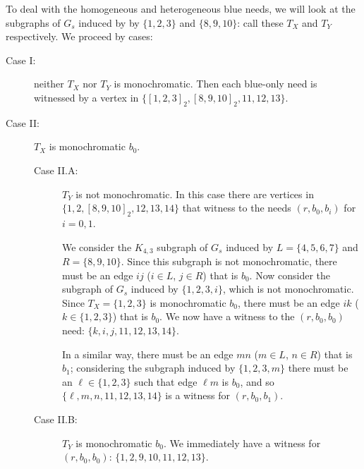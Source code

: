 \documentclass{article}
\theoremstyle{definition}
\begin{document}
To deal with the homogeneous and heterogeneous blue needs, we will look at the
subgraphs of $G_{s}$ induced by by $\{1,2,3\}$ and $\{8,9,10\}$: call these
$T_{X}$ and $T_{Y}$ respectively.  We proceed by cases:
\begin{description}
\item[Case I:] neither $T_{X}$ nor $T_{Y}$ is monochromatic. Then each blue-only
  need is witnessed by a vertex in $\{[1,2,3]_{2},[8,9,10]_{2},11,12,13\}$.
\item[Case II:] $T_{X}$ is monochromatic $b_{0}$.  




  \begin{description}
  \item[Case II.A:] $T_{Y}$ is not monochromatic. In this case there are
    vertices in $\{1,2,[8,9,10]_{2},12,13,14\}$ that witness to the needs
    $(r,b_{0},b_{i})$ for $i=0,1$. 

    We consider the $K_{4,3}$ subgraph of $G_{s}$ induced by $L=\{4,5,6,7\}$
    and $R=\{8,9,10\}$. Since this subgraph is not monochromatic, there must be
    an edge $ij$ ($i \in L$, $j \in R$) that is $b_{0}$. Now consider the
    subgraph of $G_{s}$ induced by $\{1,2,3,i\}$, which is not monochromatic.
    Since $T_{X}=\{1,2,3\}$ is monochromatic $b_{0}$, there must be an edge
    $ik$ ($k \in \{1,2,3\}$) that is $b_{0}$.  We now have a witness to the
    $(r,b_{0},b_{0})$ need: $\{k,i,j,11,12,13,14\}$.

    In a similar way, there must be an edge $mn$ ($m \in L$, $n \in R$) that is
    $b_{1}$; considering the subgraph induced by $\{1,2,3,m\}$ there must be an
    $\ell \in \{1,2,3\}$ such that edge $\ell{}m$ is $b_{0}$, and so $\{\ell,
    m, n, 11, 12, 13, 14\}$ is a witness for $(r,b_{0},b_{1})$.
  \item[Case II.B:] $T_{Y}$ is monochromatic $b_{0}$. We immediately have a
    witness for $(r, b_{0}, b_{0})$: $\{1,2,9,10,11,12,13\}$.


\end{description}
\end{description}
\end{document}
